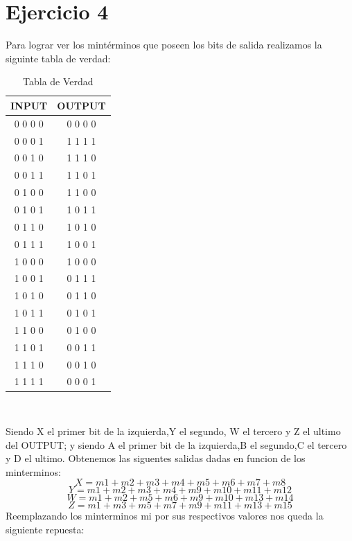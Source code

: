 \chapter*{Ejercicio 4}

Para lograr ver los mintérminos que poseen los bits de salida realizamos la siguinte tabla de verdad:
\begin{center}
	\begin{table}[h!]
		\begin{center}
			\caption{Tabla de Verdad}
			\begin{tabular}{|c|c|}
				\hline
				\textbf{INPUT} & \textbf{OUTPUT} \\
				\hline
				0 0 0 0 & 0 0 0 0\\
				\hline
				0 0 0 1 & 1 1 1 1\\
				\hline
				0 0 1 0 & 1 1 1 0\\
				\hline
				0 0 1 1 & 1 1 0 1\\
				\hline
				0 1 0 0 & 1 1 0 0\\
				\hline
				0 1 0 1 & 1 0 1 1\\
				\hline
				0 1 1 0 & 1 0 1 0\\
				\hline
				0 1 1 1 & 1 0 0 1\\
				\hline
				1 0 0 0 & 1 0 0 0\\
				\hline
				1 0 0 1 & 0 1 1 1\\
				\hline
				1 0 1 0 & 0 1 1 0\\
				\hline
				1 0 1 1 & 0 1 0 1\\
				\hline
				1 1 0 0 & 0 1 0 0\\
				\hline
				1 1 0 1 & 0 0 1 1\\
				\hline
				1 1 1 0 & 0 0 1 0\\
				\hline
				1 1 1 1 & 0 0 0 1\\
				\hline
			\end{tabular} \\
		\end{center}
	\end{table}
\end{center}
Siendo X el primer bit de la izquierda,Y el segundo, W el tercero y Z el ultimo del OUTPUT; y  siendo A el primer bit de la izquierda,B el segundo,C el tercero y D el ultimo. Obtenemos las siguentes salidas dadas en funcion de los minterminos:
	$$ X= m1+m2+m3+m4+m5+m6+m7+m8$$ 
	$$ Y = m1+m2+m3+m4+m9+m10+m11+m12$$
	$$ W = m1+m2+m5+m6+m9+m10+m13+m14$$
	$$ Z = m1+m3+m5+m7+m9+m11+m13+m15$$
Reemplazando los minterminos mi por sus respectivos valores nos queda la siguiente repuesta:
